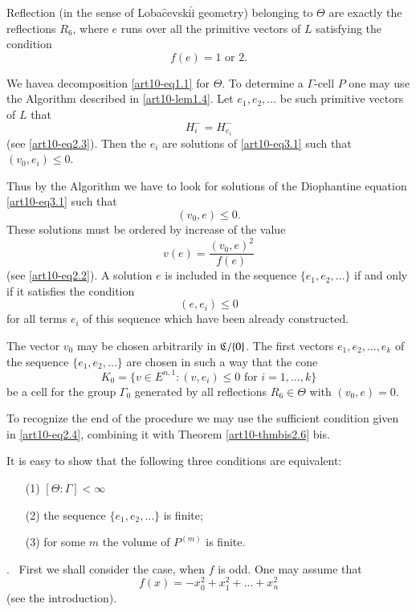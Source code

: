 Reflection (in the sense of Loba$\hat{\text{c}}$evski$\hat{\text{i}}$ geometry) belonging to $\Theta$ are exactly the reflections $R_6$, where $e$ runs over all the primitive vectors of $L$ satisfying the condition
\setcounter{equation}{0}
\begin{equation}
f(e) = 1 \text{ or } 2. \label{art10-eq3.1}
\end{equation}

We have\pageoriginale a decomposition \eqref{art10-eq1.1} for $\Theta$. To determine a $\Gamma$-cell $P$ one may use the Algorithm described in \ref{art10-lem1.4}. Let $e_1, e_2, \ldots $ be such primitive vectors of $L$ that
$$
H^-_i = H^-_{e_i}
$$
(see \eqref{art10-eq2.3}). Then the $e_i$ are solutions of \eqref{art10-eq3.1} such that $(v_0, e_i) \leqslant 0$. 

Thus by the Algorithm we have to look for solutions of the Diophantine equation \eqref{art10-eq3.1} such that
$$
(v_0, e) \leqslant 0.
$$
These solutions must be ordered by increase of the value 
$$
v(e) = \frac{(v_0, e)^2}{f(e)}
$$
(see \ref{art10-eq2.2}). A solution $e$ is included in the sequence $\{e_1, e_2, \ldots\}$ if and only if it satisfies the condition
$$
(e, e_i) \leqslant 0
$$
for all terms $e_i$ of this sequence which have been already constructed. 

The vector $v_0$ may be chosen arbitrarily in $\mathfrak{C}/\{0\}$. The first vectors $e_1, e_2, \ldots, e_k$ of the sequence $\{e_1, e_2, \ldots\}$ are chosen in such a way that the cone
$$
K_0 = \{v \in E^{n,1} : (v, e_i) \leqslant 0 \text{ for } i = 1, \ldots, k\}
$$
be a cell for the group $\Gamma_0$ generated by all reflections $R_6 \in \Theta$ with $(v_0, e) =0$.

To recognize the end of the procedure we may use the sufficient condition given in  \ref{art10-eq2.4}, combining it with Theorem \ref{art10-thmbis2.6} bis. 

It is easy to show that the following three conditions are equivalent:
\begin{itemize}
\item[(1)] $[\Theta : \Gamma] <\infty$

\item[(2)] the sequence $\{e_1, e_2, \ldots\}$ is finite;

\item[(3)] for some $m$ the volume of $P^{(m)}$ is finite.
\end{itemize}

.~  First we shall consider the case, when $f$ is odd. One may assume that
$$
f(x) = - x^2_0 + x^2_1 + \ldots + x^2_n
$$
(see the introduction).

